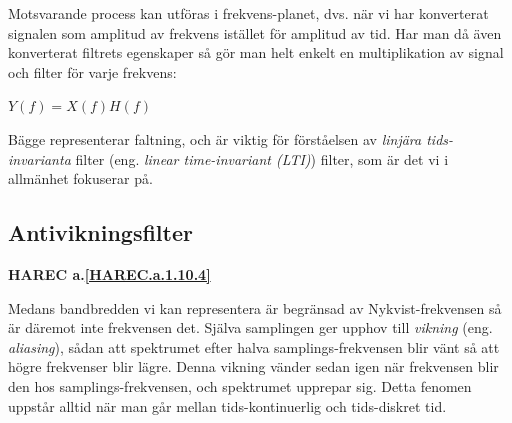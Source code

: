 Motsvarande process kan utföras i frekvens-planet, dvs. när vi har konverterat
signalen som amplitud av frekvens istället för amplitud av tid.
Har man då även konverterat filtrets egenskaper så gör man helt enkelt en
multiplikation av signal och filter för varje frekvens:

\(Y(f) = X(f)H(f)\)

Bägge representerar faltning, och är viktig för förståelsen av \emph{linjära
tids-invarianta} filter (eng. \emph{linear time-invariant (LTI)}) filter,
som är det vi i allmänhet fokuserar på.

\subsection{Antivikningsfilter}
\textbf{HAREC a.\ref{HAREC.a.1.10.4}\label{myHAREC.a.1.10.4}}

Medans bandbredden vi kan representera är begränsad av Nykvist-frekvensen så
är däremot inte frekvensen det.
Själva samplingen ger upphov till \emph{vikning} (eng. \emph{aliasing}),
sådan att spektrumet efter halva samplings-frekvensen blir vänt så att högre
frekvenser blir lägre.
Denna vikning vänder sedan igen när frekvensen blir den hos
samplings-frekvensen, och spektrumet upprepar sig.
Detta fenomen uppstår alltid när man går mellan tids-kontinuerlig och
tids-diskret tid.

